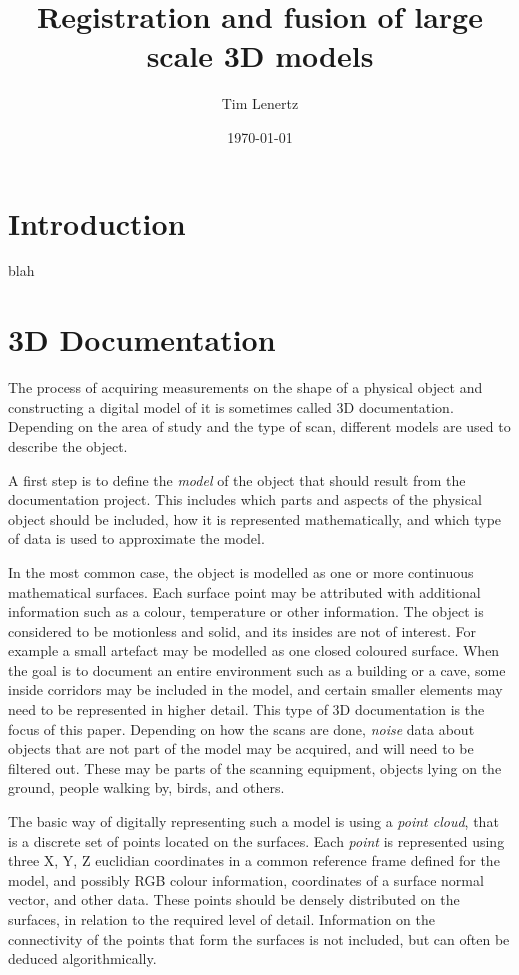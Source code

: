 \documentclass[a4paper,10pt]{scrreprt}
\begin{document}
\title{Registration and fusion of large scale 3D models}
\author{Tim Lenertz}
\date{\today}
\maketitle

\tableofcontents

\chapter{Introduction}
blah

\chapter{3D Documentation}
The process of acquiring measurements on the shape of a physical object and constructing a digital model of it is sometimes called 3D documentation. Depending on the area of study and the type of scan, different models are used to describe the object.

A first step is to define the \emph{model} of the object that should result from the documentation project. This includes which parts and aspects of the physical object should be included, how it is represented mathematically, and which type of data is used to approximate the model.

In the most common case, the object is modelled as one or more continuous mathematical surfaces. Each surface point may be attributed with additional information such as a colour, temperature or other information. The object is considered to be motionless and solid, and its insides are not of interest. For example a small artefact may be modelled as one closed coloured surface. When the goal is to document an entire environment such as a building or a cave, some inside corridors may be included in the model, and certain smaller elements may need to be represented in higher detail. This type of 3D documentation is the focus of this paper. Depending on how the scans are done, \emph{noise} data about objects that are not part of the model may be acquired, and will need to be filtered out. These may be parts of the scanning equipment, objects lying on the ground, people walking by, birds, and others.

The basic way of digitally representing such a model is using a \emph{point cloud}, that is a discrete set of points located on the surfaces. Each \emph{point} is represented using three X, Y, Z euclidian coordinates in a common reference frame defined for the model, and possibly RGB colour information, coordinates of a surface normal vector, and other data. These points should be densely distributed on the surfaces, in relation to the required level of detail. Information on the connectivity of the points that form the surfaces is not included, but can often be deduced algorithmically.
\end{document}
